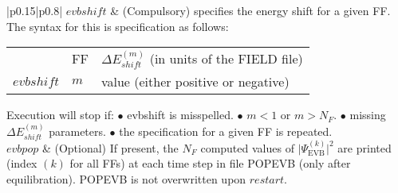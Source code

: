 \begin{longtable}[t!]{|p{}|p{}|}
\hline
$evbshift$     & (Compulsory)  specifies the energy shift for a given FF. The syntax for this is specification as follows:\newline\newline
                    \begin{tabular}{p{}p{}p{}}
                                            &      FF           &   $\Delta E^{(m)}_{shift}$ (in units of the FIELD file)\\
                      $evbshift$        &     $m$         &   value (either positive or negative)  \\ 
                     \end{tabular}\newline\newline
                     Execution will stop if:\newline
                     $\bullet$ evbshift is misspelled.\newline 
                     $\bullet$ $m < 1$ or $m> N_F$.\newline
                     $\bullet$ missing $\Delta E^{(m)}_{shift}$ parameters.\newline
                     $\bullet$ the specification for a given FF is repeated.\\                   
\hline
$evbpop$       & (Optional) If present, the $N_F$ computed values of $|\Psi^{(k)}_{\text{EVB}}\big|^{2}$ are printed (index $(k)$ for all FFs) at each time step in file POPEVB (only after equilibration). POPEVB is not overwritten upon $restart$. \\
\hline
\hline
\end{longtable}

